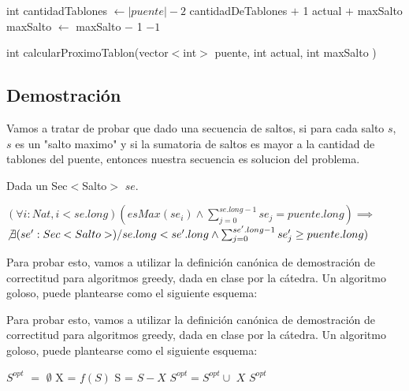 \begin{algorithm}
\begin{algorithmic}
\STATE int cantidadTablones $\gets |puente| - 2$
        \RETURN cantidadDeTablones $+$ 1
    \ENDIF
        \RETURN actual $+$ maxSalto
    \ENDIF
    \STATE maxSalto $\gets$ maxSalto $-$ 1
\ENDWHILE
\RETURN $-1$
\caption{int calcularProximoTablon(vector$<$int$>$ puente, int actual, int maxSalto )}%
\end{algorithmic}
\end{algorithm}
\subsection{Demostraci\'on}

Vamos a tratar de probar que dado una secuencia de saltos, si para cada salto $s$, $s$ es un "salto maximo" y si la sumatoria de saltos es mayor a la cantidad de tablones del puente, entonces nuestra secuencia es solucion del problema.

Dada un Sec$<$Salto$>$ $se$.

$(\forall i:Nat, i < se.long)(esMax(se_{i}) \wedge \sum_{j=0}^{se.long-1}se_{j} = puente.long)\implies$ \\ $\not\exists (se':Sec<Salto>) /
se.long < se'.long \wedge \sum_{j=0}^{se'.long-1}se'_{j} \geq puente.long)$  

Para probar esto, vamos a utilizar la definici\'on can\'onica de demostraci\'on de correctitud para algoritmos greedy, dada en clase por la c\'atedra. Un algoritmo goloso, puede plantearse como el siguiente esquema:

Para probar esto, vamos a utilizar la definici\'on can\'onica de demostraci\'on de correctitud para algoritmos greedy, dada en clase por la c\'atedra. Un algoritmo goloso, puede plantearse como el siguiente esquema:

\begin{algorithm}
\begin{algorithmic}
\STATE $S^{opt}$ $=$ $\emptyset$
    \STATE X = $f(S)$
    \STATE S = $S - {X}$
    \STATE $S^{opt} = S^{opt} \cup$ ${X}$   
    \ENDIF         
\ENDWHILE
\RETURN $S^{opt}$
\end{algorithmic}
\end{algorithm}

